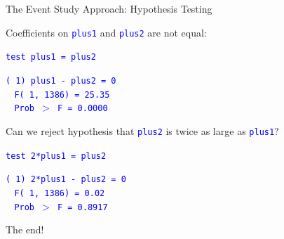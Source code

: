 \documentclass[10pt,xcolor=table,ignorenonframetext,handout,aspectratio=169]{beamer}
\begin{document}
\begin{frame}{The Event Study Approach:  Hypothesis Testing}

\medskip
Coefficients on \textcolor{blue}{\texttt{plus1}} and \textcolor{blue}{\texttt{plus2}} are not equal: \\

\medskip

\begin{small}
	\textcolor{blue}{\texttt{test plus1 = plus2}} \\
	
	\medskip
	
	\textcolor{blue}{\texttt{( 1)  plus1 - plus2 = 0}} \\
	
	\medskip
	\textcolor{blue}{\texttt{$\ \ \ \ $F(  1,  1386) =   25.35}} \\
	\textcolor{blue}{\texttt{$\ \ \ \ $Prob $>$ F =    0.0000}} 
	
\end{small}

\pause
\medskip
\medskip
Can we reject hypothesis that \textcolor{blue}{\texttt{plus2}} is twice as large as \textcolor{blue}{\texttt{plus1}}? \\

\medskip

\begin{small}
	\textcolor{blue}{\texttt{test 2*plus1 = plus2}} \\
	
	\medskip
	
	\textcolor{blue}{\texttt{( 1)  2*plus1 - plus2 = 0}} \\
	
	\medskip
	\textcolor{blue}{\texttt{$\ \ \ \ $F(  1,  1386) =    0.02}} \\
	\textcolor{blue}{\texttt{$\ \ \ \ $Prob $>$ F =    0.8917}} 
	
\end{small}

\end{frame}



\begin{frame}[plain]

	
	\begin{center}
		
		\Large{\textcolor{williams}{The end!}}
		
	\end{center}
	
\end{frame}
\end{document}

